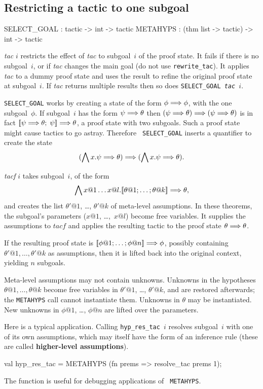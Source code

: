 \subsection{Restricting a tactic to one subgoal}
\begin{ttbox} 
SELECT_GOAL : tactic -> int -> tactic
METAHYPS    : (thm list -> tactic) -> int -> tactic
\end{ttbox}
\begin{ttdescription}
\item[\ttindexbold{SELECT_GOAL} {\it tac} $i$] 
restricts the effect of {\it tac\/} to subgoal~$i$ of the proof state.  It
fails if there is no subgoal~$i$, or if {\it tac\/} changes the main goal
(do not use {\tt rewrite_tac}).  It applies {\it tac\/} to a dummy proof
state and uses the result to refine the original proof state at
subgoal~$i$.  If {\it tac\/} returns multiple results then so does 
\hbox{\tt SELECT_GOAL {\it tac} $i$}.

{\tt SELECT_GOAL} works by creating a state of the form $\phi\Longrightarrow\phi$,
with the one subgoal~$\phi$.  If subgoal~$i$ has the form $\psi\Longrightarrow\theta$
then $(\psi\Longrightarrow\theta)\Longrightarrow(\psi\Longrightarrow\theta)$ is in fact
$\mathopen{[\![}\psi\Longrightarrow\theta;\; \psi\mathclose{]\!]}\Longrightarrow\theta$, a proof state with two subgoals.
Such a proof state might cause tactics to go astray.  Therefore {\tt
  SELECT_GOAL} inserts a quantifier to create the state
\[ (\bigwedge x.\psi\Longrightarrow\theta)\Longrightarrow(\bigwedge x.\psi\Longrightarrow\theta). \]

\item[\ttindexbold{METAHYPS} {\it tacf} $i$]
takes subgoal~$i$, of the form 
\[ \Forall x@1 \ldots x@l. \List{\theta@1; \ldots; \theta@k}\Imp\theta, \]
and creates the list $\theta'@1$, \ldots, $\theta'@k$ of meta-level
assumptions.  In these theorems, the subgoal's parameters ($x@1$,
\ldots,~$x@l$) become free variables.  It supplies the assumptions to
$tacf$ and applies the resulting tactic to the proof state
$\theta\Longrightarrow\theta$.

If the resulting proof state is $\List{\phi@1; \ldots; \phi@n} \Imp \phi$,
possibly containing $\theta'@1,\ldots,\theta'@k$ as assumptions, then it is
lifted back into the original context, yielding $n$ subgoals.

Meta-level assumptions may not contain unknowns.  Unknowns in the
hypotheses $\theta@1,\ldots,\theta@k$ become free variables in $\theta'@1$,
\ldots, $\theta'@k$, and are restored afterwards; the {\tt METAHYPS} call
cannot instantiate them.  Unknowns in $\theta$ may be instantiated.  New
unknowns in $\phi@1$, \ldots, $\phi@n$ are lifted over the parameters.

Here is a typical application.  Calling {\tt hyp_res_tac}~$i$ resolves
subgoal~$i$ with one of its own assumptions, which may itself have the form
of an inference rule (these are called {\bf higher-level assumptions}).  
\begin{ttbox} 
val hyp_res_tac = METAHYPS (fn prems => resolve_tac prems 1);
\end{ttbox} 
The function  is useful for debugging applications of {\tt
  METAHYPS}. 
\end{ttdescription}

